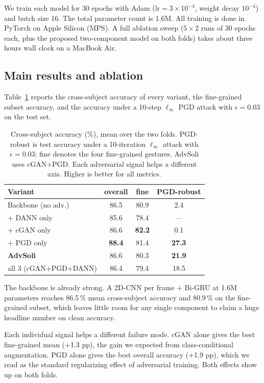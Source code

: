 \documentclass[10pt,twocolumn,letterpaper]{article}
\begin{document}
We train each model for 30 epochs with Adam
($\text{lr}{=}3\!\times\!10^{-4}$, weight decay $10^{-4}$) and batch
size 16. The total parameter count is 1.6M. All training is done in
PyTorch on Apple Silicon (MPS). A full ablation sweep ($5{\times}2$
runs of 30 epochs each, plus the proposed two-component model on both
folds) takes about three hours wall clock on a MacBook Air.

\subsection{Main results and ablation}
Table~\ref{tab:abl} reports the cross-subject accuracy of every variant,
the fine-grained subset accuracy, and the accuracy under a 10-step
$\ell_\infty$ PGD attack with $\epsilon{=}0.03$ on the test set.

\begin{table}[h]
\centering
\scriptsize
\setlength{\tabcolsep}{2.4pt}
\begin{tabular}{lccc}
\toprule
Variant & overall & fine & PGD-robust \\
\midrule
Backbone (no adv.)        & 86.5 & 80.9 & 2.4 \\
+ DANN only               & 85.6 & 78.4 & --- \\
+ cGAN only               & 86.6 & \textbf{82.2} & 0.1 \\
+ PGD only                & \textbf{88.4} & 81.4 & \textbf{27.3} \\
\midrule
\textbf{AdvSoli}        & 86.6 & 80.3 & \textbf{21.9} \\
all 3 (cGAN+PGD+DANN)     & 86.4 & 79.4 & 18.5 \\
\bottomrule
\end{tabular}
\caption{Cross-subject accuracy (\%), mean over the two folds.
PGD-robust is test accuracy under a 10-iteration $\ell_\infty$ attack
with $\epsilon{=}0.03$; fine denotes the four fine-grained gestures.
AdvSoli uses cGAN+PGD. Each adversarial signal helps a different axis.
Higher is better for all metrics.}
\label{tab:abl}
\end{table}

The backbone is already strong. A 2D-CNN per frame + Bi-GRU at 1.6M
parameters reaches 86.5\,\% mean cross-subject accuracy and 80.9\,\%
on the fine-grained subset, which leaves little room for any single
component to claim a huge headline number on clean accuracy.

Each individual signal helps a different failure mode. cGAN alone gives
the best fine-grained mean (+1.3 pp), the gain we expected from
class-conditional augmentation. PGD alone gives the best overall
accuracy (+1.9 pp), which we read as the standard regularizing effect
of adversarial training. Both effects show up on both folds.
\end{document}
